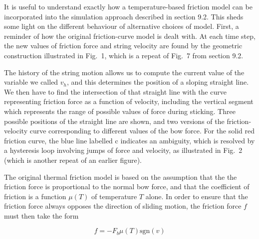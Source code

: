   It is useful to understand exactly how a temperature-based friction model can 
  be incorporated into the simulation approach described in section 9.2. This 
  sheds some light on the different behaviour of alternative choices of model. 
  First, a reminder of how the original friction-curve model is dealt with. At 
  each time step, the new values of friction force and string velocity are 
  found by the geometric construction illustrated in Fig.\ 1, which is a repeat 
  of Fig.\ 7 from section 9.2. 


  The history of the string motion allows us to compute the current value of 
  the variable we called $v_h$, and this determines the position of a sloping 
  straight line. We then have to find the intersection of that straight line 
  with the curve representing friction force as a function of velocity, 
  including the vertical segment which represents the range of possible values 
  of force during sticking. Three possible positions of the straight line are 
  shown, and two versions of the friction-velocity curve corresponding to 
  different values of the bow force. For the solid red friction curve, the blue 
  line labelled c indicates an ambiguity, which is resolved by a hysteresis 
  loop involving jumps of force and velocity, as illustrated in Fig.\ 2 (which 
  is another repeat of an earlier figure). 


  The original thermal friction model is based on the assumption that the the 
  friction force is proportional to the normal bow force, and that the 
  coefficient of friction is a function $\mu(T)$ of temperature $T$ alone. In 
  order to ensure that the friction force always opposes the direction of 
  sliding motion, the friction force $f$ must then take the form 

  \begin{equation*}f=-F_b \mu(T) \mathrm{sgn}(v) \tag{1}\end{equation*} 

